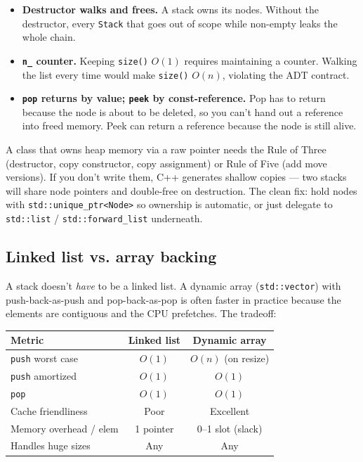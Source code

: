 \documentclass[11pt]{article}
\begin{document}
\begin{itemize}[leftmargin=*]
    \item \textbf{Destructor walks and frees.} A stack owns its
          nodes. Without the destructor, every \texttt{Stack}
          that goes out of scope while non-empty leaks the whole
          chain.
    \item \textbf{\texttt{n\_} counter.} Keeping \texttt{size()}
          $O(1)$ requires maintaining a counter. Walking the list
          every time would make \texttt{size()} $O(n)$, violating
          the ADT contract.
    \item \textbf{\texttt{pop} returns by value; \texttt{peek} by
          const-reference.} Pop has to return because the node is
          about to be deleted, so you can't hand out a reference
          into freed memory. Peek can return a reference because
          the node is still alive.
\end{itemize}

\begin{warnbox}
A class that owns heap memory via a raw pointer needs the Rule of
Three (destructor, copy constructor, copy assignment) or Rule of
Five (add move versions). If you don't write them, C++ generates
shallow copies --- two stacks will share node pointers and
double-free on destruction. The clean fix: hold nodes with
\texttt{std::unique\_ptr<Node>} so ownership is automatic, or
just delegate to \texttt{std::list} / \texttt{std::forward\_list}
underneath.
\end{warnbox}

\subsection*{Linked list vs. array backing}

A stack doesn't \emph{have} to be a linked list. A dynamic array
(\texttt{std::vector}) with push-back-as-push and pop-back-as-pop
is often faster in practice because the elements are contiguous
and the CPU prefetches. The tradeoff:

\begin{center}
\begin{tabular}{|l|c|c|}
\hline
\textbf{Metric} & \textbf{Linked list} & \textbf{Dynamic array} \\
\hline
\texttt{push} worst case  & $O(1)$        & $O(n)$ (on resize) \\
\texttt{push} amortized   & $O(1)$        & $O(1)$ \\
\texttt{pop}              & $O(1)$        & $O(1)$ \\
Cache friendliness        & Poor          & Excellent \\
Memory overhead / elem    & 1 pointer     & 0--1 slot (slack) \\
Handles huge sizes        & Any           & Any \\
\hline
\end{tabular}
\end{center}
\end{document}
